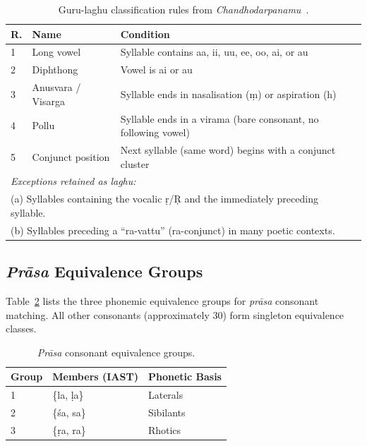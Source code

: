\documentclass[11pt]{article}
\begin{document}
\begin{table}[H]
\centering
\small
\caption{Guru-laghu classification rules from
\textit{Chandhodarpanamu}~\citep{chandhodarpanamu}.}
\label{tab:gurulaghu}
\begin{tabular}{p{0.4cm}p{2.3cm}p{4.1cm}}
\toprule
\textbf{R.} & \textbf{Name} & \textbf{Condition} \\
\midrule
1 & Long vowel
  & Syllable contains aa, ii, uu, ee, oo, ai, or au \\
2 & Diphthong
  & Vowel is ai or au \\
3 & Anusvara / Visarga
  & Syllable ends in nasalisation (\d{m}) or aspiration (h) \\
4 & Pollu
  & Syllable ends in a virama (bare consonant, no following vowel) \\
5 & Conjunct position
  & Next syllable (same word) begins with a conjunct cluster \\
\midrule
\multicolumn{3}{l}{\textit{Exceptions retained as laghu:}} \\
\multicolumn{3}{p{7.2cm}}{(a) Syllables containing the vocalic \d{r}/\d{R}
and the immediately preceding syllable.} \\
\multicolumn{3}{p{7.2cm}}{(b) Syllables preceding a ``ra-vattu''
(ra-conjunct) in many poetic contexts.} \\
\bottomrule
\end{tabular}
\end{table}

\subsection{\textit{Pr\={a}sa} Equivalence Groups}
\label{app:prasa}

Table~\ref{tab:prasa} lists the three phonemic equivalence groups for
\textit{pr\={a}sa} consonant matching. All other consonants (approximately
30) form singleton equivalence classes.

\begin{table}[H]
\centering
\small
\caption{\textit{Pr\={a}sa} consonant equivalence groups.}
\label{tab:prasa}
\begin{tabular}{lll}
\toprule
\textbf{Group} & \textbf{Members (IAST)} & \textbf{Phonetic Basis} \\
\midrule
1 & \{la, \d{l}a\}     & Laterals \\
2 & \{\'{s}a, sa\}      & Sibilants \\
3 & \{\d{r}a, ra\}      & Rhotics \\
\bottomrule
\end{tabular}
\end{table}
\end{document}
